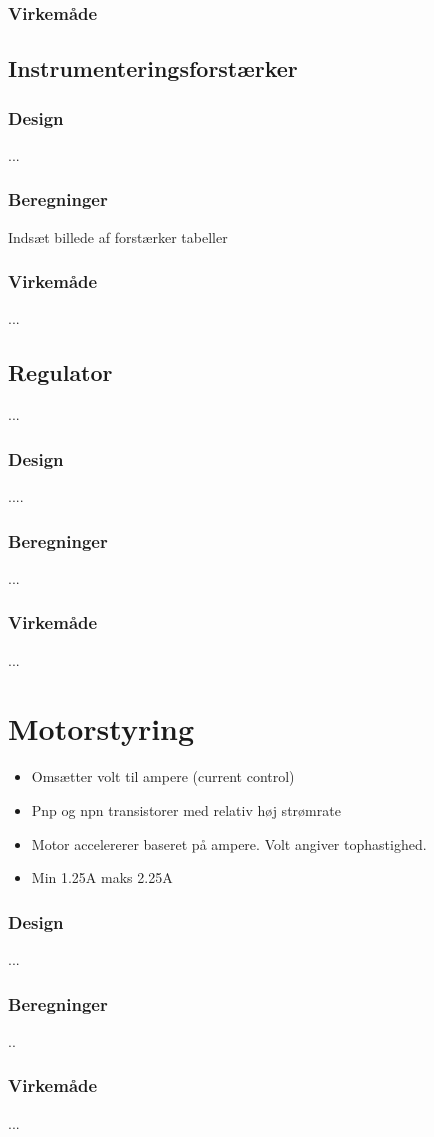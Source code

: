 \subsubsection{Virkemåde}

\subsection{Instrumenteringsforstærker}

\subsubsection{Design}
...

\subsubsection{Beregninger}

Indsæt billede af forstærker tabeller

\subsubsection{Virkemåde}
... 

\subsection{Regulator}
...

\subsubsection{Design}

....

\subsubsection{Beregninger}

...

\subsubsection{Virkemåde}

...
\section{Motorstyring}\label{sec:sec_motorstyring}

\begin{itemize}
	\item Omsætter volt til ampere (current control)
	\item Pnp og npn transistorer med relativ høj strømrate
	\item Motor accelererer baseret på ampere. Volt angiver tophastighed.
	\item Min 1.25A maks 2.25A
\end{itemize}

\subsubsection{Design}
...

\subsubsection{Beregninger}
..

\subsubsection{Virkemåde}
...